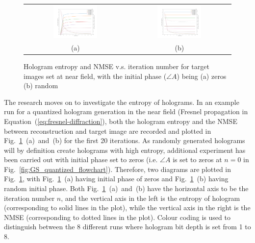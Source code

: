 	\begin{figure} [ht]
		\begin{center}
			\begin{tabular}{c c}
				\includegraphics[trim={90 50 60 80}, clip, width = 0.45\textwidth]{GS_Fresnel0.1_iterations_zero_start.png} &
				\includegraphics[trim={90 50 60 80}, clip, width = 0.45\textwidth]{GS_Fresnel0.1_iterations_random_start.png} \\
				(a) & (b)
			\end{tabular}
			\caption{\label{fig:GS_Fresnel0.1_iterations} Hologram entropy and NMSE v.s. iteration number for target images set at near field, with the initial phase ($\angle A$) being (a) zeros (b) random}
		\end{center}
	\end{figure}

	The research moves on to investigate the entropy of holograms. In an example run for a quantized hologram generation in the near field (Fresnel propagation in Equation~(\ref{eq:fresnel-diffraction}), both the hologram entropy and the NMSE between reconstruction and target image are recorded and plotted in Fig.~\ref{fig:GS_Fresnel0.1_iterations}~(a)~and~(b) for the first 20 iterations. As randomly generated holograms will by definition create holograms with high entropy, additional experiment has been carried out with initial phase set to zeros (i.e. $\angle A$ is set to zeros at $n=0$ in Fig.~\ref{fig:GS_quantized_flowchart}). Therefore, two diagrams are plotted in Fig.~\ref{fig:GS_Fresnel0.1_iterations}, with Fig.~\ref{fig:GS_Fresnel0.1_iterations}~(a) having initial phase of zeros and Fig.~\ref{fig:GS_Fresnel0.1_iterations}~(b) having random initial phase. Both Fig.~\ref{fig:GS_Fresnel0.1_iterations}~(a)~and~(b) have the horizontal axis to be the iteration number $n$, and the vertical axis in the left is the entropy of hologram (corresponding to solid lines in the plot), while the vertical axis in the right is the NMSE (corresponding to dotted lines in the plot). Colour coding is used to distinguish between the 8 different runs where hologram bit depth is set from 1 to 8.

